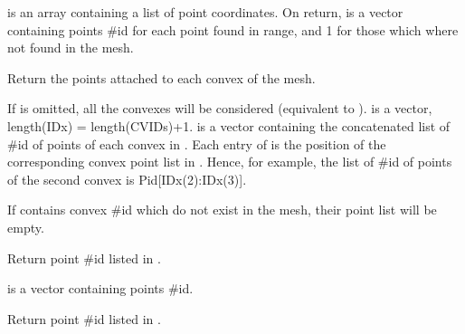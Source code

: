 \documentclass[a4paper,11pt,english]{sphinxmanual}
\begin{document}
\begin{fulllineitems}
\begin{fulllineitems}
 is an array containing a list of point coordinates. On
return,  is a vector containing points
\#id for each point found in  range, and \sphinxhyphen{}1 for those
which where not found in the mesh.

\end{fulllineitems}


\begin{fulllineitems}
\label{\detokenize{python/cmdref_Mesh:getfem.Mesh.pid_from_cvid}}
Return the points attached to each convex of the mesh.

If  is omitted, all the convexes will be considered
(equivalent to ).  is a
vector, length(IDx) = length(CVIDs)+1.  is a
vector containing the concatenated list of \#id of
points of each convex in . Each entry of  is the
position of the corresponding convex point list in . Hence,
for example, the list of \#id of points of the second convex is
Pid{[}IDx(2):IDx(3){]}.

If  contains convex \#id which do not exist in the mesh,
their point list will be empty.

\end{fulllineitems}


\begin{fulllineitems}
\label{\detokenize{python/cmdref_Mesh:getfem.Mesh.pid_in_cvids}}
Return point \#id listed in .

 is a vector containing points \#id.

\end{fulllineitems}


\begin{fulllineitems}
\label{\detokenize{python/cmdref_Mesh:getfem.Mesh.pid_in_faces}}
Return point \#id listed in .


\end{fulllineitems}
\end{fulllineitems}
\end{document}
